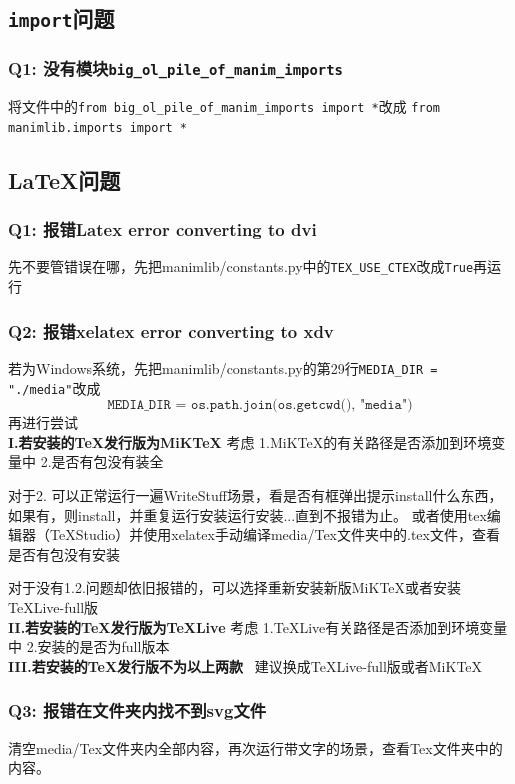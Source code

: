 \documentclass[UTF8]{ctexart}
\begin{document}
\subsection{\texttt{import}问题}
\subsubsection*{Q1: 没有模块\texttt{big\_ol\_pile\_of\_manim\_imports}}
将文件中的\texttt{from big\_ol\_pile\_of\_manim\_imports import *}改成
\texttt{from manimlib.imports import *}

\subsection{\LaTeX 问题}

\subsubsection*{Q1: 报错Latex error converting to dvi}
先不要管错误在哪，先把manimlib/constants.py中的\texttt{TEX\_USE\_CTEX}改成\texttt{True}再运行

\subsubsection*{Q2: 报错xelatex error converting to xdv}
若为Windows系统，先把manimlib/constants.py的第29行\texttt{MEDIA\_DIR = "./media"}改成
$$
\texttt{MEDIA\_DIR = os.path.join(os.getcwd(), "media")}
$$
再进行尝试\\

\textbf{I.若安装的\TeX 发行版为MiK\TeX}
考虑 1.MiK\TeX 的有关路径是否添加到环境变量中 2.是否有包没有装全

对于2. 可以正常运行一遍WriteStuff场景，看是否有框弹出提示install什么东西，如果有，则install，并重复运行安装运行安装...直到不报错为止。
或者使用tex编辑器（\TeX Studio）并使用xelatex手动编译media/Tex文件夹中的.tex文件，查看是否有包没有安装

对于没有1.2.问题却依旧报错的，可以选择重新安装新版MiK\TeX 或者安装\TeX Live-full版\\

\textbf{II.若安装的\TeX 发行版为\TeX Live}
考虑 1.\TeX Live有关路径是否添加到环境变量中 2.安装的是否为full版本\\

\textbf{III.若安装的\TeX 发行版不为以上两款}
\ 建议换成\TeX Live-full版或者MiK\TeX

\subsubsection*{Q3: 报错在文件夹内找不到svg文件}
清空media/Tex文件夹内全部内容，再次运行带文字的场景，查看Tex文件夹中的内容。
\end{document}
